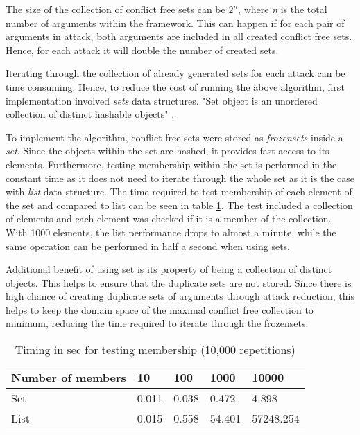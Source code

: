 The size of the collection of conflict free sets can be $2^n$, where \textit{n} is the total number of arguments within the framework. This can happen if for each pair of arguments in attack, both arguments are included in all created conflict free sets. Hence, for each attack it will double the number of created sets. 

Iterating through the collection of already generated sets for each attack can be time consuming. Hence, to reduce the cost of running the above algorithm, first implementation involved \textit{sets} data structures. "Set object is an unordered collection of distinct hashable objects" \citep{python_sets}.

To implement the algorithm, conflict free sets were stored as \textit{frozensets} inside a \textit{set}. Since the objects within the set are hashed, it provides fast access to its elements. Furthermore, testing membership within the set is performed in the constant time as it does not need to iterate through the whole set as it is the case with \textit{list} data structure. The time required to test membership of each element of the set and compared to list can be seen in table \ref{table:timingsMembership}. The test included a collection of elements and each element was checked if it is a member of the collection. With 1000 elements, the list performance drops to almost a minute, while the same operation can be performed in half a second when using sets. 

Additional benefit of using set is its property of being a collection of distinct objects. This helps to ensure that the duplicate sets are not stored. Since there is high chance of creating duplicate sets of arguments through attack reduction, this helps to keep the domain space of the maximal conflict free collection to minimum, reducing the time required to iterate through the frozensets.

\begin{table}[h]
	\centering
	\caption{Timing in sec for testing membership (10,000 repetitions)}
	\label{table:timingsMembership}
	\begin{tabular}{lllll}
		\hline
		Number of members & 10    & 100   & 1000   & 10000 \\ \hline
		Set                & 0.011 & 0.038 & 0.472  & 4.898 \\
		List               & 0.015 & 0.558 & 54.401 & 57248.254 \\     
	\end{tabular}
\end{table}


